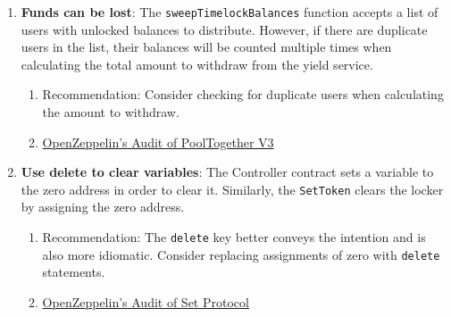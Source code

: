 \begin{enumerate}
\item\textbf{Funds can be lost}: The \verb|sweepTimelockBalances| function accepts a list of users with unlocked balances to distribute. However, if there are duplicate users in the list, their balances will be counted multiple times when calculating the total amount to withdraw from the yield service.
	\begin{enumerate}
	\item Recommendation: Consider checking for duplicate users when calculating the amount to withdraw.
	\item\href{https://blog.openzeppelin.com/pooltogether-v3-audit/}{OpenZeppelin's Audit of PoolTogether V3}
	\end{enumerate}

\item\textbf{Use delete to clear variables}: The Controller contract sets a variable to the zero address in order to clear it. Similarly, the \verb|SetToken| clears the locker by assigning the zero address.
	\begin{enumerate}
	\item Recommendation: The \verb|delete| key better conveys the intention and is also more idiomatic. Consider replacing assignments of zero with \verb|delete| statements.
	\item\href{https://blog.openzeppelin.com/set-protocol-audit/}{OpenZeppelin's Audit of Set Protocol}
	\end{enumerate}

\end{enumerate}
